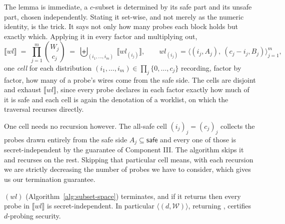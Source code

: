   The lemma is immediate, a $c$-subset is determined by its safe part and its
  unsafe part, chosen independently. Stating it set-wise, and not merely as the
  numeric identity, is the trick. It says not only how many probes each
  block holds but exactly which. Applying it in every factor and
  multiplying out,
  \[
    \llbracket wl \rrbracket \;=\; \prod_{j=1}^{m} \binom{W_j}{c_j}
    \;=\; \biguplus_{(i_1, \dots, i_m)} \ \llbracket wl_{(i_j)} \rrbracket,
    \qquad
    wl_{(i_j)} = \big\langle (i_j, A_j),\ (c_j - i_j, B_j) \big\rangle_{j=1}^{m},
  \]
  one \emph{cell} for each distribution $(i_1, \dots, i_m) \in \prod_j \{0, \dots, c_j\}$
  recording, factor by factor, how many of a probe's wires come from the safe
  side. The cells are disjoint and exhaust $\llbracket wl \rrbracket$, since every
  probe declares in each factor exactly how much of it is safe and each cell
  is again the denotation of a worklist, on which the traversal recurses directly.

  One cell needs no recursion however. The all-safe cell $(i_j)_j = (c_j)_j$
  collects the probes drawn entirely from the safe side $A_j \subseteq
  \mathsf{safe}$ and every one of
  those is secret-independent by the guarantee of Component III. The algorithm
  skips it and recurses on the rest. Skipping that particular cell means, with each
  recursion we are strictly decreasing the number of probes we have to consider,
  which gives us our termination guarantee.

  \begin{theorem}
  \label{thm:traversal}
  \textup{}$(wl)$ (Algorithm~\ref{alg:subset-space})
  terminates, and if it returns \textup{\Secure{}} then every probe in
  $\llbracket wl \rrbracket$ is secret-independent. In particular
  \textup{}$\big\langle (d, \mathcal{W}) \big\rangle$, returning
  \textup{\Secure{}}, certifies $d$-probing security.
  \end{theorem}

